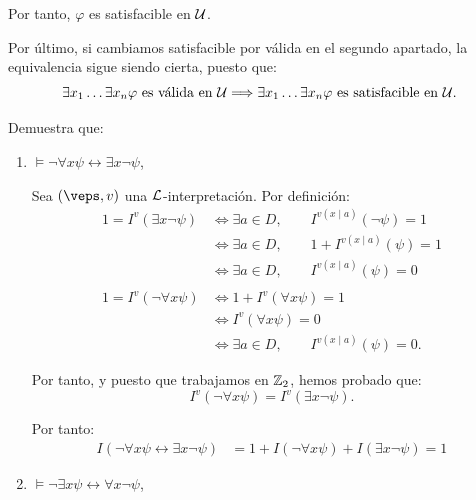 \begin{ejercicio}
\begin{description}
        Por tanto, $\varphi$ es satisfacible en $\mathcal{U}$.
    \end{description}

    Por último, si cambiamos satisfacible por válida en el segundo apartado, la equivalencia sigue siendo cierta, puesto que:
    \begin{equation*}
        \exists x_1 \ldots \exists x_n \varphi\text{ es válida en }\mathcal{U}\Longrightarrow
        \exists x_1 \ldots \exists x_n \varphi\text{ es satisfacible en }\mathcal{U}.
    \end{equation*}
        
\end{ejercicio}

\begin{ejercicio}\label{ej:2.6}
    Demuestra que:
    \begin{enumerate}
        \item $\models \neg \forall x \psi \leftrightarrow \exists x \neg \psi$,
        
        Sea $(\veps,v)$ una $\mathcal{L}$-interpretación. Por definición:
        \begin{align*}
            1 = I^v(\exists x \neg \psi)
            &\iff \exists a\in D,\qquad I^{v(x\mid a)}(\neg \psi) = 1\\
            &\iff \exists a\in D,\qquad 1+I^{v(x\mid a)}(\psi) = 1\\
            &\iff \exists a\in D,\qquad I^{v(x\mid a)}(\psi) = 0\\\\
            1 = I^v(\neg \forall x \psi)
            &\iff 1+I^v(\forall x \psi) = 1\\
            &\iff I^{v}( \forall x \psi) = 0\\
            &\iff \exists a\in D,\qquad I^{v(x\mid a)}(\psi) = 0.
        \end{align*}

        Por tanto, y puesto que trabajamos en $\mathbb{Z}_2$, hemos probado que:
        \begin{equation*}
            I^v(\neg \forall x \psi) =I^v(\exists x \neg \psi).
        \end{equation*}

        Por tanto:
        \begin{align*}
            I( \neg \forall x \psi \leftrightarrow \exists x \neg \psi)
            &= 1+I(\neg \forall x \psi)+I(\exists x \neg \psi)=1
        \end{align*}
        \item $\models \neg \exists x \psi \leftrightarrow \forall x \neg \psi$,
        

\end{enumerate}
\end{ejercicio}
